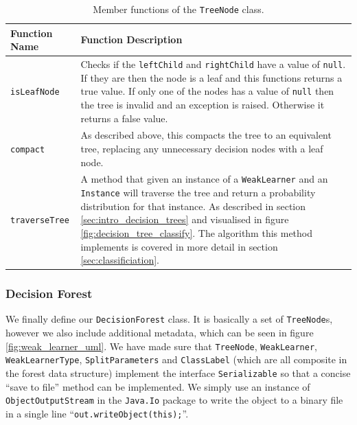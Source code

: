 \documentclass[12pt,twoside,notitlepage]{report}
\begin{document}
                \begin{table}[H]
                    \begin{tabularx}{\textwidth}{l|X}
                        \textbf{Function Name} & \textbf{Function Description} \\
                        \hline

                        \texttt{isLeafNode} & 
                            Checks if the \texttt{leftChild} and \texttt{rightChild} have a value of \texttt{null}. If 
                            they are then the node is a leaf and this functions returns a true value. If only one of the 
                            nodes has a value of \texttt{null} then the tree is invalid and an exception is raised. 
                            Otherwise it returns a false value. \\ 
                        \hline

                        \texttt{compact} & 
                            As described above, this compacts the tree to an equivalent tree, replacing any unnecessary 
                            decision nodes with a leaf node. \\ 
                        \hline

                        \texttt{traverseTree} &
                            A method that given an instance of a \texttt{WeakLearner} and an \texttt{Instance} will 
                            traverse the tree and return a probability distribution for that instance. As described in 
                            section \ref{sec:intro_decision_trees} and visualised in figure 
                            \ref{fig:decision_tree_classify}. The algorithm this method implements is covered in more 
                            detail in section \ref{sec:classificiation}.

                    \end{tabularx}
                    \caption{Member functions of the \texttt{TreeNode} class.}
                    \label{tab:TreeNode}
                \end{table}




            \subsubsection{Decision Forest} \label{sec:DecisionForest}
                We finally define our \texttt{DecisionForest} class. It is basically a set of \texttt{TreeNode}s, 
                however we also include additional metadata, which can be seen in figure \ref{fig:weak_learner_uml}. 
                We have made sure that \texttt{TreeNode}, \texttt{WeakLearner}, \texttt{WeakLearnerType}, 
                \texttt{SplitParameters} and \texttt{ClassLabel} (which are all composite in the forest data structure) 
                implement the interface \texttt{Serializable} so that a concise ``save to file'' method can be 
                implemented. We simply use an instance of \texttt{ObjectOutputStream} in the \texttt{Java.Io} package 
                to write the object to a binary file in a single line ``\texttt{out.writeObject(this);}''.
\end{document}
